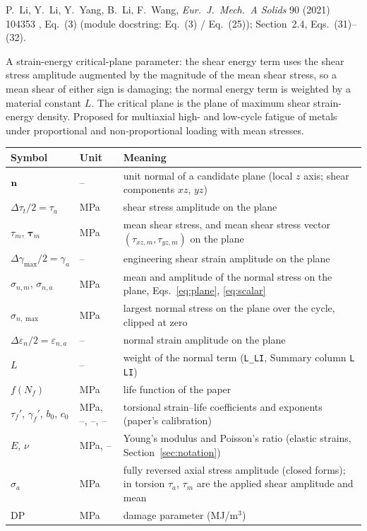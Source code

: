 \label{sheet:LI}

 P.~Li, Y.~Li, Y.~Yang, B.~Li, F.~Wang, \emph{Eur.\ J.\ Mech.\ A Solids} 90 (2021)
104353 \cite{li2021}, Eq.~(3) (module docstring: Eq.~(3) / Eq.~(25)); Section~2.4, Eqs.~(31)--(32).

 A strain-energy critical-plane parameter: the shear energy term uses the
shear stress amplitude augmented by the magnitude of the mean shear stress, so a mean shear of
either sign is damaging; the normal energy term is weighted by a material constant $L$. The critical
plane is the plane of maximum shear strain-energy density. Proposed for multiaxial high- and
low-cycle fatigue of metals under proportional and non-proportional loading with mean stresses.

\begin{center}\small
\begin{tabular}{@{}llp{100mm}@{}}
\toprule
Symbol & Unit & Meaning\\\midrule
$\mathbf n$ & -- & unit normal of a candidate plane (local $z$ axis; shear components $xz$, $yz$)\\
$\Delta\tau_t/2=\tau_a$ & MPa & shear stress amplitude on the plane\\
$\tau_m$, $\boldsymbol\tau_m$ & MPa & mean shear stress, and mean shear stress vector $(\tau_{xz,m},\tau_{yz,m})$ on the plane\\
$\Delta\gamma_{\max}/2=\gamma_a$ & -- & engineering shear strain amplitude on the plane\\
$\sigma_{n,m}$, $\sigma_{n,a}$ & MPa & mean and amplitude of the normal stress on the plane, Eqs.~\eqref{eq:plane}, \eqref{eq:scalar}\\
$\sigma_{n,\max}$ & MPa & largest normal stress on the plane over the cycle, clipped at zero\\
$\Delta\varepsilon_n/2=\varepsilon_{n,a}$ & -- & normal strain amplitude on the plane\\
$L$ & -- & weight of the normal term (\texttt{L\_LI}, Summary column \texttt{L LI})\\
$f(N_f)$ & MPa & life function of the paper\\
$\tau_f'$, $\gamma_f'$, $b_0$, $c_0$ & MPa, --, --, -- & torsional strain--life coefficients and exponents (paper's calibration)\\
$E$, $\nu$ & MPa, -- & Young's modulus and Poisson's ratio (elastic strains, Section~\ref{sec:notation})\\
$\sigma_a$ & MPa & fully reversed axial stress amplitude (closed forms); in torsion $\tau_a$, $\tau_m$ are the applied shear amplitude and mean\\
$\mathrm{DP}$ & MPa & damage parameter (MJ/m$^3$)\\
\bottomrule
\end{tabular}
\end{center}

